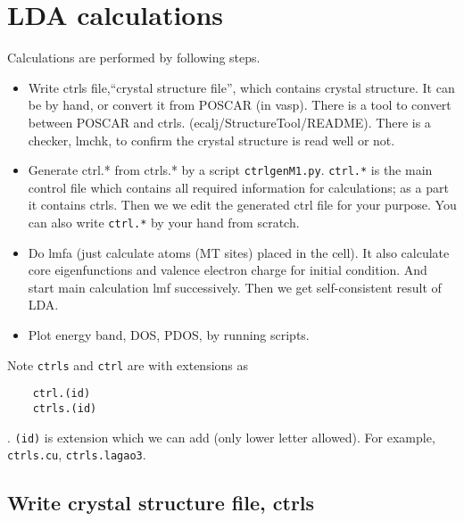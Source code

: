 \documentclass[a4paper,10pt,epsf,fleqn]{article}
\begin{document}
\section{LDA calculations}
Calculations are performed by following steps.
\begin{itemize}
\item Write ctrls file,``crystal structure file'', which contains crystal structure.
  It can be by hand, or convert it from POSCAR (in vasp). There
  is a tool to convert between POSCAR and ctrls. (ecalj/StructureTool/README).
  There is a checker, lmchk, to confirm the crystal structure is read well or not.
\item Generate ctrl.* from ctrls.* by a script \verb+ctrlgenM1.py+. 
     \verb+ctrl.*+ is the main control file which contains all required
      information for calculations; as a part it contains ctrls.
      Then we we edit the generated ctrl file for your purpose.
      You can also write \verb+ctrl.*+ by your hand from scratch.
\item Do lmfa (just calculate atoms (MT sites) placed in the cell). 
      It also calculate core eigenfunctions and valence electron charge for initial
      condition. And start main calculation lmf successively. 
      Then we get self-consistent result of LDA.
\item Plot energy band, DOS, PDOS, by running scripts.
\end{itemize}

Note \verb+ctrls+ and \verb+ctrl+ are with extensions as
\begin{verbatim}
    ctrl.(id)
    ctrls.(id)
\end{verbatim}
. \verb+(id)+ is extension which we can add
(only lower letter allowed). For example, \verb+ctrls.cu+, \verb+ctrls.lagao3+. 



\subsection{Write crystal structure file, ctrls}
\label{ctrls}
\end{document}
